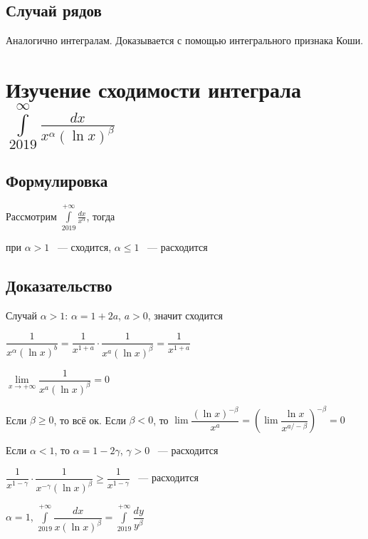\documentclass{article}
\begin{document}
        \subsection{Случай рядов}
            
            Аналогично интегралам. Доказывается с помощью интегрального признака Коши.
            
    \newpage
    
    \section{Изучение сходимости интеграла $\int\limits_{2019}^{\infty}\frac{dx}{x^{\alpha}(\ln x)^{\beta}}$}
    
        \subsection{Формулировка}
        
            Рассмотрим $\int\limits^{+\infty}_{2019} \frac{dx}{x^{\alpha}}$, тогда
            
            при $\alpha > 1$ ~--- сходится, $\alpha \leq 1$ ~--- расходится
            
        \subsection{Доказательство}
        
            Случай $\alpha > 1$: $\alpha = 1 + 2a$, $a > 0$, значит сходится
        
            $\dfrac{1}{x^{\alpha} (\ln {x})^b} = \dfrac{1}{x^{1 + a}} \cdot \dfrac{1}{x^a(\ln{x})^{\beta}} = \dfrac{1}{x^{1 + a}}$
        
            $\lim\limits_{x \rightarrow +\infty} \dfrac{1}{x^a (\ln{x})^{\beta}} = 0$
        
            Если $\beta \geq 0$, то всё ок. Если $\beta < 0$, то $\lim \dfrac{(\ln{x})^{-\beta}}{x^a} = \left( \lim \dfrac{\ln{x}}{x^{a / -\beta}} \right)^{-\beta} = 0$
        
            Если $\alpha < 1$, то $\alpha = 1 - 2 \gamma$, $\gamma > 0$ ~--- расходится
        
            $\dfrac{1}{x^{1 - \gamma}} \cdot \dfrac{1}{x^{-\gamma}(\ln{x})^{\beta}} \geq \dfrac{1}{x^{1 - \gamma}}$ ~--- расходится
        
            $\alpha = 1$, $\int\limits^{+\infty}_{2019} \dfrac{dx}{x(\ln{x})^{\beta}} = \int\limits^{+\infty}_{2019} \dfrac{dy}{y^{\beta}}$
        
\end{document}
